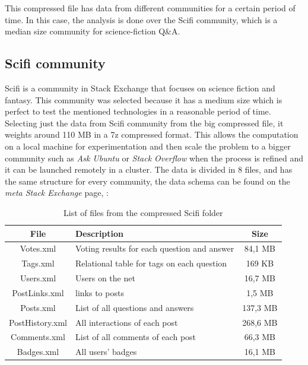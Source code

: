 \documentclass[11pt]{book} %
\begin{document}
    This compressed file has data from different communities for a certain period of time. In this case, the analysis is done over the Scifi community, which is a median size community for science-fiction Q\&A.

    \subsection{Scifi community}

    Scifi is a community in Stack Exchange that focuses on science fiction and fantasy. This community was selected because it has a medium size which is perfect to test the mentioned technologies in a reasonable period of time. Selecting just the data from Scifi community from the big compressed file, it weights around 110 MB in a 7z compressed format. This allows the computation on a local machine for experimentation and then scale the problem to a bigger community such as \emph{Ask Ubuntu} or \emph{Stack Overflow} when the process is refined and it can be launched remotely in a cluster. The data is divided in 8 files, and has the same structure for every community, the data schema can be found on the \emph{meta Stack Exchange} page, \cite{meta-Stack Exchange-data-structure}:

    \begin{table}[!ht]
      \centering
      \begin{tabular}{|c|p{}|c|}
        \hline

        File & Description & Size \\ \hline
        Votes.xml & Voting results for each question and answer & 84,1 MB \\ \hline
        Tags.xml & Relational table for tags on each question & 169 KB \\ \hline
        Users.xml & Users on the net & 16,7 MB \\ \hline
        PostLinks.xml & links to posts & 1,5 MB \\ \hline
        Posts.xml & List of all questions and answers & 137,3 MB \\ \hline
        PostHistory.xml & All interactions of each post & 268,6 MB \\ \hline
        Comments.xml & List of all comments of each post & 66,3 MB \\ \hline
        Badges.xml & All users' badges & 16,1 MB \\

        \hline
      \end{tabular}
      \caption{List of files from the compressed Scifi folder}
      \label{tab:list_of_files}
    \end{table}
\end{document}
